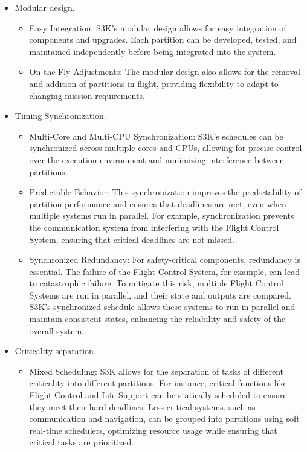 \documentclass[a4paper,11pt]{article}
\begin{document}
\begin{itemize}
		\item Modular design. 
			\begin{itemize}			
				\item Easy Integration: 
					S3K's modular design allows for easy integration of components and upgrades. 
					Each partition can be developed, tested, and maintained independently before being integrated into the system.
				\item On-the-Fly Adjustments: 
					The modular design also allows for the removal and addition of partitions in-flight, providing flexibility to adapt to changing mission requirements.
			\end{itemize}
		\item Timing Synchronization. 
			\begin{itemize}
				\item Multi-Core and Multi-CPU Synchronization: 
					S3K's schedules can be synchronized across multiple cores and CPUs, allowing for precise control over the execution environment and minimizing interference between partitions.
				\item Predictable Behavior: 
					This synchronization improves the predictability of partition performance and ensures that deadlines are met, even when multiple systems run in parallel. 
					For example, synchronization prevents the communication system from interfering with the Flight Control System, ensuring that critical deadlines are not missed.
				\item Synchronized Redundancy: 
					For safety-critical components, redundancy is essential. 
					The failure of the Flight Control System, for example, can lead to catastrophic failure. 
					To mitigate this risk, multiple Flight Control Systems are run in parallel, and their state and outputs are compared.
					S3K's synchronized schedule allows these systems to run in parallel and maintain consistent states, enhancing the reliability and safety of the overall system.
			\end{itemize}
		\item Criticality separation.
			\begin{itemize}			
				\item Mixed Scheduling: 
					S3K allows for the separation of tasks of different criticality into different partitions. 
					For instance, critical functions like Flight Control and Life Support can be statically scheduled to ensure they meet their hard deadlines.
					Less critical systems, such as communication and navigation, can be grouped into partitions using soft real-time schedulers, optimizing resource usage while ensuring that critical tasks are prioritized.

\end{itemize}
\end{itemize}
\end{document}
